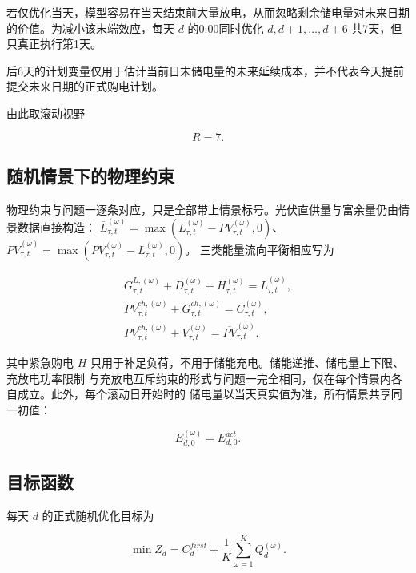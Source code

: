 若仅优化当天，模型容易在当天结束前大量放电，从而忽略剩余储电量对未来日期的价值。为减小该末端效应，每天 \(d\) 的0:00同时优化 \(d,d+1,\ldots,d+6\) 共7天，但只真正执行第1天。

后6天的计划变量仅用于估计当前日末储电量的未来延续成本，并不代表今天提前提交未来日期的正式购电计划。

由此取滚动视野

\[
R=7.
\]

\subsection{随机情景下的物理约束}

物理约束与问题一逐条对应，只是全部带上情景标号。光伏直供量与富余量仍由情景数据直接构造：
\(\overline L^{(\omega)}_{\tau,t}=\max(L^{(\omega)}_{\tau,t}-PV^{(\omega)}_{\tau,t},0)\)、
\(\overline{PV}^{(\omega)}_{\tau,t}=\max(PV^{(\omega)}_{\tau,t}-L^{(\omega)}_{\tau,t},0)\)。
三类能量流向平衡相应写为

\begin{equation}
\begin{gathered}
G^{L,(\omega)}_{\tau,t}+D^{(\omega)}_{\tau,t}+H^{(\omega)}_{\tau,t}=\overline L^{(\omega)}_{\tau,t},\\
PV^{ch,(\omega)}_{\tau,t}+G^{ch,(\omega)}_{\tau,t}=C^{(\omega)}_{\tau,t},\\
PV^{ch,(\omega)}_{\tau,t}+V^{(\omega)}_{\tau,t}=\overline{PV}^{(\omega)}_{\tau,t}.
\end{gathered}
\end{equation}

其中紧急购电 \(H\) 只用于补足负荷，不用于储能充电。储能递推、储电量上下限、充放电功率限制
与充放电互斥约束的形式与问题一完全相同，仅在每个情景内各自成立。此外，每个滚动日开始时的
储电量以当天真实值为准，所有情景共享同一初值：

\begin{equation}
E^{(\omega)}_{d,0}=E^{act}_{d,0}.
\end{equation}

\subsection{目标函数}

每天 \(d\) 的正式随机优化目标为

\begin{equation}
\min Z_d
=
C_d^{first}
+
\frac1K
\sum_{\omega=1}^{K}
Q_d^{(\omega)}.
\end{equation}

